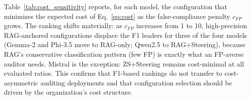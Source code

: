 \documentclass{ieeeaccess}
\begin{document}
Table~\ref{tab:cost_sensitivity} reports, for each model, the configuration that minimizes the expected cost of Eq.~\ref{eq:cost} as the false-compliance penalty $c_{FP}$ grows. The ranking shifts materially: as $c_{FP}$ increases from 1 to 10, high-precision RAG-anchored configurations displace the F1 leaders for three of the four models (Gemma-2 and Phi-3.5 move to RAG-only; Qwen2.5 to RAG+Steering), because RAG's conservative classification pattern (few FP) is exactly what an FP-averse auditor needs. Mistral is the exception: ZS+Steering remains cost-minimal at all evaluated ratios. This confirms that F1-based rankings do not transfer to cost-asymmetric auditing deployments and that configuration selection should be driven by the organization's cost structure.

\begin{table}[htbp]
\centering
\caption{Cost-minimizing configuration per model under the expected-cost function of Eq.~\ref{eq:cost} ($c_{FN}=1$; normalized cost in parentheses). As the false-compliance penalty grows, high-precision RAG configurations dominate for three of four models.}
\label{tab:cost_sensitivity}
\renewcommand{\arraystretch}{1.2}
\end{table}
\end{document}
